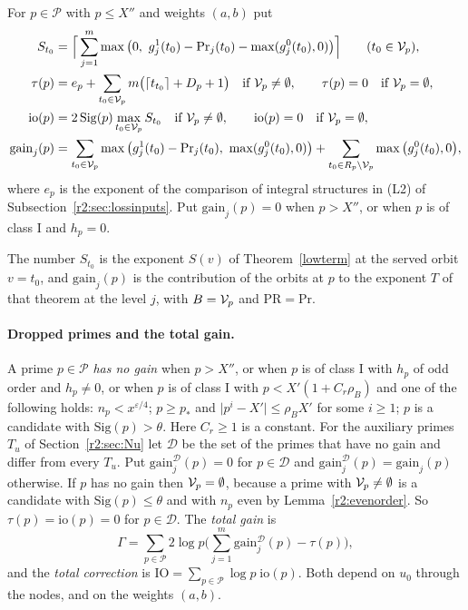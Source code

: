 \begin{definition}\label{r2:localq}
For $p\in\mathcal P$ with $p\le X''$ and weights $(a,b)$ put
\begin{align*}
S_{t_0}&=\Big\lceil\sum_{j=1}^m\max\big(0,\ g^1_j(t_0)-\mathrm{Pr}_j(t_0)-\max(g^0_j(t_0),0)\big)\Big\rceil\qquad(t_0\in\cV_p),\\
\tau(p)&=e_p+\sum_{t_0\in\cV_p}m\big(\lceil t_{t_0}\rceil+D_p+1\big)\quad\text{if }\cV_p\ne\emptyset,\qquad\tau(p)=0\quad\text{if }\cV_p=\emptyset,\\
\mathrm{io}(p)&=2\,\mathrm{Sig}(p)\max_{t_0\in\cV_p}S_{t_0}\quad\text{if }\cV_p\ne\emptyset,\qquad\mathrm{io}(p)=0\quad\text{if }\cV_p=\emptyset,\\
\mathrm{gain}_j(p)&=\sum_{t_0\in\cV_p}\max\big(g^1_j(t_0)-\mathrm{Pr}_j(t_0),\ \max(g^0_j(t_0),0)\big)+\sum_{t_0\in R_p\setminus\cV_p}\max\big(g^0_j(t_0),0\big),
\end{align*}
where $e_p$ is the exponent of the comparison of integral structures in (L2) of Subsection~\ref{r2:sec:lossinputs}. Put $\mathrm{gain}_j(p)=0$ when $p>X''$, or when $p$ is of class I and $h_p=0$.
\end{definition}

The number $S_{t_0}$ is the exponent $S(v)$ of Theorem~\ref{lowterm} at the served orbit $v=t_0$, and $\mathrm{gain}_j(p)$ is the contribution of the orbits at $p$ to the exponent $T$ of that theorem at the level $j$, with $B=\mathcal V_p$ and $\mathrm{PR}=\mathrm{Pr}$.

\paragraph{Dropped primes and the total gain.} A prime $p\in\mathcal P$ \emph{has no gain} when $p>X''$, or when $p$ is of class I with $h_p$ of odd order and $h_p\ne0$, or when $p$ is of class I with $p<X'(1+C_r\rho_B)$ and one of the following holds: $n_p<x^{\varepsilon/4}$; $p\ge p_*$ and $\lvert p^i-X'\rvert\le\rho_BX'$ for some $i\ge1$; $p$ is a candidate with $\mathrm{Sig}(p)>\theta$. Here $C_r\ge1$ is a constant. For the auxiliary primes $T_u$ of Section~\ref{r2:sec:Nu} let $\mathcal D$ be the set of the primes that have no gain and differ from every $T_u$. Put $\mathrm{gain}^{\mathcal D}_j(p)=0$ for $p\in\mathcal D$ and $\mathrm{gain}^{\mathcal D}_j(p)=\mathrm{gain}_j(p)$ otherwise. If $p$ has no gain then $\mathcal V_p=\emptyset$, because a prime with $\mathcal V_p\ne\emptyset$ is a candidate with $\mathrm{Sig}(p)\le\theta$ and with $n_p$ even by Lemma~\ref{r2:evenorder}. So $\tau(p)=\mathrm{io}(p)=0$ for $p\in\mathcal D$. The \emph{total gain} is
\begin{equation}\label{r2:Gamma}
\Gamma=\sum_{p\in\mathcal P}2\log p\Big(\sum_{j=1}^m\mathrm{gain}^{\mathcal D}_j(p)-\tau(p)\Big),
\end{equation}
and the \emph{total correction} is $\mathrm{IO}=\sum_{p\in\mathcal P}\log p\;\mathrm{io}(p)$. Both depend on $u_0$ through the nodes, and on the weights $(a,b)$.

